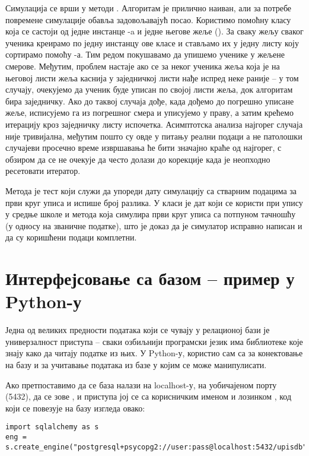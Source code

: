 Симулација се врши у методи . Алгоритам је прилично наиван, али за потребе повремене симулације обавља задовољавајућ посао. Користимо помоћну класу  која се састоји од једне инстанце -a и једне његове жеље (). За сваку жељу сваког ученика креирамо по једну инстанцу ове класе и стављамо их у једну листу коју сортирамо помоћу -а. Тим редом покушавамо да упишемо ученике у жељене смерове. Међутим, проблем настаје ако се за неког ученика жеља која је на његовој листи жеља каснија у заједничкој листи нађе испред неке раније -- у том случају, очекујемо да ученик буде уписан по својој листи жеља, док алгоритам бира заједничку. Ако до таквој случаја дође, када дођемо до погрешно уписане жеље, исписујемо га из погрешног смера и уписујемо у праву, а затим крећемо итерацију кроз заједничку листу испочетка. Асимптотска анализа најгорег случаја није тривијална, међутим пошто су овде у питању реални подаци а не патолошки случајеви просечно време извршавања ће бити значајно краће од најгорег, с обзиром да се не очекује да често долази до корекције када је неопходно ресетовати итератор. %

Метода  је тест који служи да упореди дату симулацију са стварним подацима за први круг уписа и испише број разлика. У класи  је дат  који се користи при упису у средње школе и  метода која симулира први круг уписа са потпуном тачношћу (у односу на званичне податке), што је доказ да је симулатор исправно написан и да су коришћени подаци комплетни.


\section{Интерфејсовање са базом -- пример у Python-у}

Једна од великих предности података који се чувају у релационој бази је универзалност приступа -- сваки озбиљнији програмски језик има библиотеке које знају како да читају податке из њих. У Python-у, користио сам  са  за конектовање на базу и  за учитавање података из базе у  којим се може манипулисати.

Ако претпоставимо да се база налази на localhost-у, на уобичајеном порту (5432), да се зове , и приступа јој се са корисничким именом  и лозинком , код који се повезује на базу изгледа овако:
\begin{verbatim}
import sqlalchemy as s
eng = s.create_engine("postgresql+psycopg2://user:pass@localhost:5432/upisdb")
\end{verbatim}


